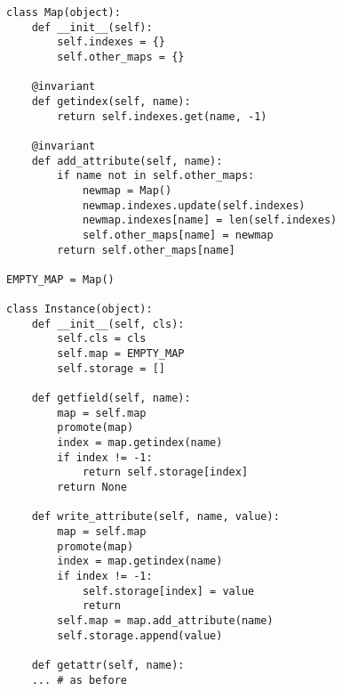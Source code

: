 \begin{lstlisting}[mathescape,basicstyle=\ttfamily]
class Map(object):
    def __init__(self):
        self.indexes = {}
        self.other_maps = {}

    @invariant
    def getindex(self, name):
        return self.indexes.get(name, -1)

    @invariant
    def add_attribute(self, name):
        if name not in self.other_maps:
            newmap = Map()
            newmap.indexes.update(self.indexes)
            newmap.indexes[name] = len(self.indexes)
            self.other_maps[name] = newmap
        return self.other_maps[name]

EMPTY_MAP = Map()

class Instance(object):
    def __init__(self, cls):
        self.cls = cls
        self.map = EMPTY_MAP
        self.storage = []

    def getfield(self, name):
        map = self.map
        promote(map)
        index = map.getindex(name)
        if index != -1:
            return self.storage[index]
        return None

    def write_attribute(self, name, value):
        map = self.map
        promote(map)
        index = map.getindex(name)
        if index != -1:
            self.storage[index] = value
            return
        self.map = map.add_attribute(name)
        self.storage.append(value)

    def getattr(self, name):
	... # as before
\end{lstlisting}
